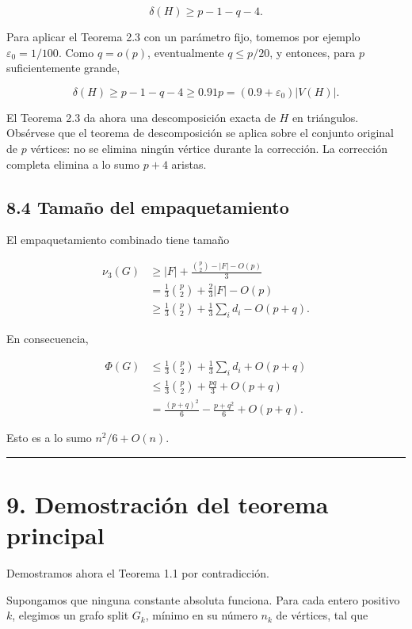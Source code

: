 \documentclass[
  11pt,
]{article}
\begin{document}
\[
\delta(H)\ge p-1-q-4.
\tag{8.8}
\]

Para aplicar el Teorema 2.3 con un parámetro fijo, tomemos por ejemplo
\(\varepsilon_0=1/100\). Como \(q=o(p)\), eventualmente \(q\le p/20\), y
entonces, para \(p\) suficientemente grande,

\[
\delta(H)\ge p-1-q-4\ge0.91p=(0.9+\varepsilon_0)|V(H)|.
\tag{8.9}
\]

El Teorema 2.3 da ahora una descomposición exacta de \(H\) en
triángulos. Obsérvese que el teorema de descomposición se aplica sobre
el conjunto original de \(p\) vértices: no se elimina ningún vértice
durante la corrección. La corrección completa elimina a lo sumo \(p+4\)
aristas.

\subsection{8.4 Tamaño del
empaquetamiento}\label{tamauxf1o-del-empaquetamiento}

El empaquetamiento combinado tiene tamaño

\[
\begin{aligned}
\nu_3(G)
&\ge
|F|+\frac{\binom p2-|F|-O(p)}3\\
&=
\frac13\binom p2+\frac23|F|-O(p)\\
&\ge
\frac13\binom p2+\frac13\sum_i d_i-O(p+q).
\end{aligned}
\tag{8.10}
\]

En consecuencia,

\[
\begin{aligned}
\Phi(G)
&\le
\frac13\binom p2+\frac13\sum_i d_i+O(p+q)\\
&\le
\frac13\binom p2+\frac{pq}{3}+O(p+q)\\
&=
\frac{(p+q)^2}{6}-\frac{p+q^2}{6}+O(p+q).
\end{aligned}
\tag{8.11}
\]

Esto es a lo sumo \(n^2/6+O(n)\).

\begin{center}\rule{0.5\linewidth}{0.5pt}\end{center}

\section{9. Demostración del teorema
principal}\label{demostraciuxf3n-del-teorema-principal}

Demostramos ahora el Teorema 1.1 por contradicción.

Supongamos que ninguna constante absoluta funciona. Para cada entero
positivo \(k\), elegimos un grafo split \(G_k\), mínimo en su número
\(n_k\) de vértices, tal que
\end{document}
